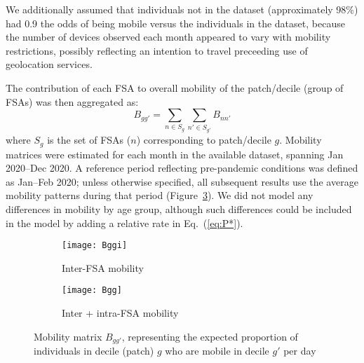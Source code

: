 We additionally assumed that individuals not in the dataset (approximately 98\%) had
0.9 the odds of being mobile versus the individuals in the dataset,
because the number of devices observed each month appeared to vary with mobility restrictions,
possibly reflecting an intention to travel preceeding use of geolocation services.
\par
The contribution of each FSA to overall mobility of the patch/decile (group of FSAs)
was then aggregated as:
\begin{equation}\label{eq:Bgg}
  B_{gg'} = \sum_{n \in S_g}\sum_{n' \in S_{g'}} B_{nn'}
\end{equation}
where $S_g$ is the set of FSAs ($n$) corresponding to patch/decile $g$.
Mobility matrices were estimated for each month in the available dataset,
spanning Jan 2020--Dec 2020.
A reference period reflecting pre-pandemic conditions was defined as Jan--Feb 2020;
unless otherwise specified, all subsequent results use the average mobility patterns during that period
(Figure~\ref{fig:Bgg}).
We did not model any differences in mobility by age group,
although such differences could be included in the model by adding a relative rate in Eq.~(\ref{eq:P*}).
\begin{figure}
  \centering
  \begin{subfigure}{0.49\linewidth}
    \texttt{[image: Bggi]}
    \caption{Inter-FSA mobility}
    \label{fig:Bggo}
  \end{subfigure}\hfill%
  \begin{subfigure}{0.49\linewidth}
    \texttt{[image: Bgg]}
    \caption{Inter + intra-FSA mobility}
    \label{fig:Bggd}
  \end{subfigure}
  \caption{Mobility matrix $B_{gg'}$, representing
    the expected proportion of individuals in decile (patch) $g$
    who are mobile in decile $g'$ per day}
  \label{fig:Bgg}
\end{figure}
